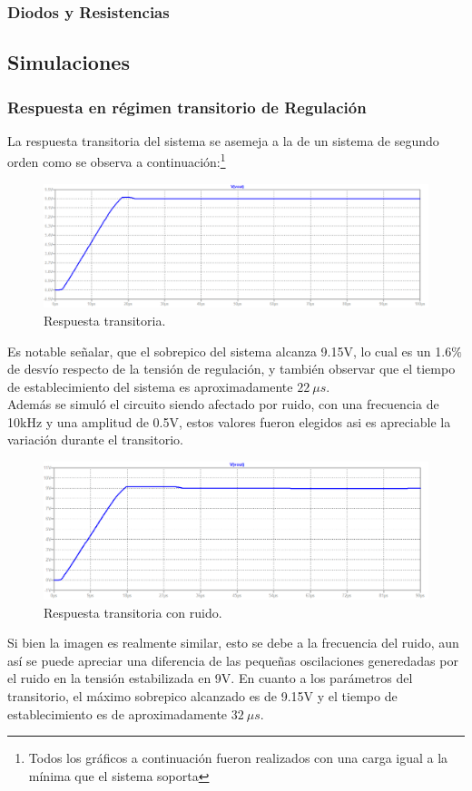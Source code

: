 \subsubsection{Diodos y Resistencias}

\subsection{Simulaciones}
\subsubsection{Respuesta en régimen transitorio de Regulación}
La respuesta transitoria del sistema se asemeja a la de un sistema de segundo orden como se observa a continuación:\footnote{Todos los gráficos a continuación fueron realizados con una carga igual a la mínima que el sistema soporta}
\begin{figure}[H]
\centering
	\includegraphics[width=1\textwidth]{ImagenesEjercicio2/transresp.png}
	\caption{Respuesta transitoria.}
	\label{fig:transitorioFuente}
\end{figure}
Es notable señalar, que el sobrepico del sistema alcanza 9.15V, lo cual es un 1.6$\%$ de desvío respecto de la tensión de regulación, y también observar que el tiempo de establecimiento del sistema es aproximadamente $22 \ \mu s$.\\
Además se simuló el circuito siendo afectado por ruido, con una frecuencia de 10kHz y una amplitud de 0.5V, estos valores fueron elegidos asi es apreciable la variación  durante el transitorio.
\begin{figure}[H]
\centering
	\includegraphics[width=1\textwidth]{ImagenesEjercicio2/transrespnoise.png}
	\caption{Respuesta transitoria con ruido.}
	\label{fig:transitorioFuentenoise}
\end{figure}
Si bien la imagen es realmente similar, esto se debe a la frecuencia del ruido, aun así se puede apreciar una diferencia de las pequeñas oscilaciones generedadas por el ruido en la tensión estabilizada en 9V. En cuanto a los parámetros del transitorio, el máximo sobrepico alcanzado es de 9.15V y el tiempo de establecimiento es de aproximadamente $32 \ \mu s$.
